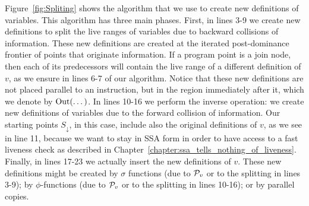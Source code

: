 Figure~\ref{fig:Spliting} shows the algorithm that we use to create new
definitions of variables.
This algorithm has three main phases.
First, in lines 3-9 we create new definitions to split the live ranges
of variables due to backward collisions of information.
These new definitions are created at the iterated post-dominance
frontier of points that originate information.
If a program point is a join node, then each of its predecessors
will contain the live range of a different definition of $v$, as we ensure
in lines 6-7 of our algorithm.
Notice that these new definitions are not placed parallel to an instruction,
but in the region immediately after it, which we denote by $\mathrm{Out}(\dots)$.
In lines 10-16 we perform the inverse operation: we create new definitions of
variables due to the forward collision of information.
Our starting points $S_\downarrow$, in this case, include also the original definitions of
$v$, as we see in line 11, because we want to stay in SSA form in order to
have access to a fast liveness check as described in Chapter~\ref{chapter:ssa_tells_nothing_of_liveness}.
Finally, in lines 17-23 we actually insert the new definitions of $v$.
These new definitions might be created by $\sigma$ functions (due to ${\cal P}_v$ or
to the splitting in lines 3-9); by $\phi$-functions (due to ${\cal P}_v$ or to the
splitting in lines 10-16); or by parallel copies.

